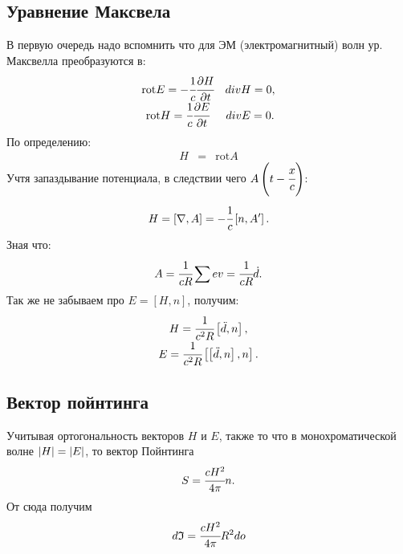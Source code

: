 \documentclass[a4paper]{article}
\newcommand{\inner}[1]{\left( #1 \right)}
\newcommand{\insqr}[1]{\left[ #1 \right]}
\newcommand{\rot}{\text{rot}}
\numberwithin{equation}{section}
\begin{document}
\subsection{Уравнение Максвела}
В первую очередь надо вспомнить что для ЭМ (электромагнитный) волн 
ур. Максвелла преобразуются в:
\begin{gather}
    \begin{matrix}
        \rot E = -\cfrac{1}{c} \cfrac{\partial H}{\partial t} & div H = 0, \\
        \rot H = \cfrac{1}{c} \cfrac{\partial E}{\partial t} & div E = 0.
    \end{matrix}
\end{gather} 
По определению:
\begin{eqnarray}
    H &=& \rot A
\end{eqnarray} 
Учтя запаздывание потенциала, в следствии чего $A\inner{t - \cfrac{x}{c}}$:
\begin{gather}
    H = \insqr{\nabla, A} = -\cfrac{1}{c}\insqr{n, A'}.
\end{gather}
Зная что:
\begin{equation}
    A = \cfrac{1}{cR} \sum ev = \cfrac{1}{cR} \dot d.
\end{equation}
Так же не забываем про $E = \insqr{H, n}$, получим:
\begin{eqnarray}
    \begin{matrix}
        H = \cfrac{1}{c^2R}\insqr{\ddot d, n}, \\
        E = \cfrac{1}{c^2R}\insqr{\insqr{\ddot d, n}, n}.
    \end{matrix}
    \label{eq:2.5}
\end{eqnarray}

\subsection{Вектор пойнтинга}
Учитывая ортогональность векторов $H$ и $E$, также то что в 
монохроматической волне $\abs{H} = \abs{E}$, то вектор Пойнтинга
\begin{equation}
    S = \cfrac{cH^2}{4\pi}n.
\end{equation}
От сюда получим 
\begin{equation}
    d\mathfrak{I} = \cfrac{cH^2}{4\pi}R^2do
    \label{eq:2.7}
\end{equation}
\end{document}
